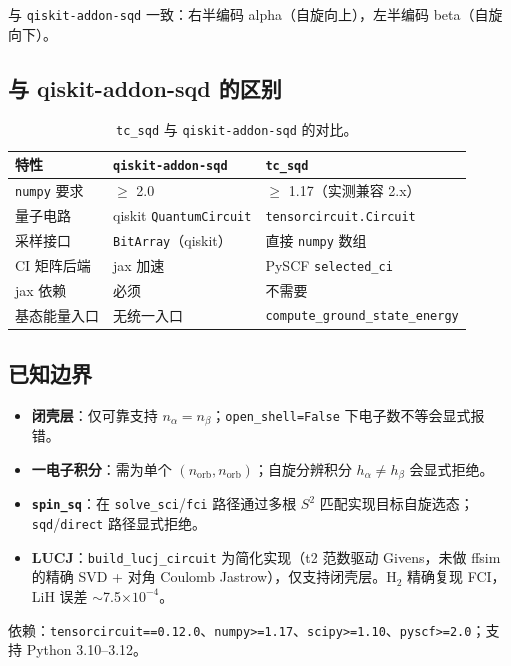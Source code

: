 \documentclass[UTF8,12pt,a4paper]{ctexart}
\newcommand{\Htwo}{H$_2$}
\begin{document}
与 \texttt{qiskit-addon-sqd} 一致：右半编码 alpha（自旋向上），左半编码 beta（自旋向下）。

\subsection{与 qiskit-addon-sqd 的区别}

\begin{table}[H]
\centering
\caption{\texttt{tc\_sqd} 与 \texttt{qiskit-addon-sqd} 的对比。}
\begin{tabular}{lll}
\toprule
特性 & \texttt{qiskit-addon-sqd} & \texttt{tc\_sqd} \\
\midrule
\texttt{numpy} 要求 & $\ge$ 2.0 & $\ge$ 1.17（实测兼容 2.x） \\
量子电路 & qiskit \texttt{QuantumCircuit} & \texttt{tensorcircuit.Circuit} \\
采样接口 & \texttt{BitArray}（qiskit） & 直接 \texttt{numpy} 数组 \\
CI 矩阵后端 & jax 加速 & PySCF \texttt{selected\_ci} \\
jax 依赖 & 必须 & 不需要 \\
基态能量入口 & 无统一入口 & \texttt{compute\_ground\_state\_energy} \\
\bottomrule
\end{tabular}
\end{table}

\subsection{已知边界}

\begin{itemize}[leftmargin=1.6em]
  \item \textbf{闭壳层}：仅可靠支持 $n_\alpha=n_\beta$；\texttt{open\_shell=False} 下电子数不等会显式报错。
  \item \textbf{一电子积分}：需为单个 $(n_{\text{orb}},n_{\text{orb}})$；自旋分辨积分 $h_\alpha\ne h_\beta$ 会显式拒绝。
  \item \textbf{\texttt{spin\_sq}}：在 \texttt{solve\_sci}/\texttt{fci} 路径通过多根 $S^2$ 匹配实现目标自旋选态；\texttt{sqd}/\texttt{direct} 路径显式拒绝。
  \item \textbf{LUCJ}：\texttt{build\_lucj\_circuit} 为简化实现（t2 范数驱动 Givens，未做 ffsim 的精确 SVD + 对角 Coulomb Jastrow），仅支持闭壳层。\Htwo{} 精确复现 FCI，LiH 误差 $\sim$7.5$\times10^{-4}$。
\end{itemize}

依赖：\texttt{tensorcircuit==0.12.0}、\texttt{numpy>=1.17}、\texttt{scipy>=1.10}、\texttt{pyscf>=2.0}；支持 Python 3.10--3.12。
\end{document}
